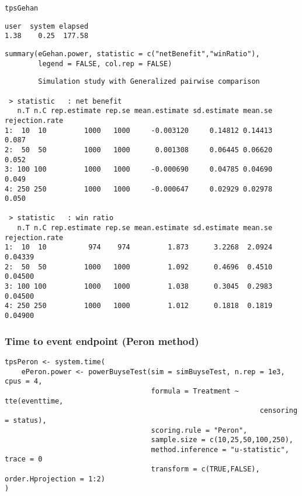 \documentclass[12pt]{article}
\begin{document}
\lstset{language=r,label= ,caption= ,captionpos=b,numbers=none}
\begin{lstlisting}
tpsGehan
\end{lstlisting}

\begin{verbatim}
user  system elapsed 
1.38    0.25  177.58
\end{verbatim}

\lstset{language=r,label= ,caption= ,captionpos=b,numbers=none}
\begin{lstlisting}
summary(eGehan.power, statistic = c("netBenefit","winRatio"), 
		legend = FALSE, col.rep = FALSE)
\end{lstlisting}

\begin{verbatim}
        Simulation study with Generalized pairwise comparison

 > statistic   : net benefit
   n.T n.C rep.estimate rep.se mean.estimate sd.estimate mean.se rejection.rate
1:  10  10         1000   1000     -0.003120     0.14812 0.14413          0.087
2:  50  50         1000   1000      0.001308     0.06445 0.06620          0.052
3: 100 100         1000   1000     -0.000690     0.04785 0.04690          0.049
4: 250 250         1000   1000     -0.000647     0.02929 0.02978          0.050

 > statistic   : win ratio
   n.T n.C rep.estimate rep.se mean.estimate sd.estimate mean.se rejection.rate
1:  10  10          974    974         1.873      3.2268  2.0924        0.04339
2:  50  50         1000   1000         1.092      0.4696  0.4510        0.04500
3: 100 100         1000   1000         1.038      0.3045  0.2983        0.04500
4: 250 250         1000   1000         1.012      0.1818  0.1819        0.04900
\end{verbatim}

\clearpage

\subsubsection{Time to event endpoint (Peron method)}
\label{sec:orgde3aa80}
\lstset{language=r,label= ,caption= ,captionpos=b,numbers=none}
\begin{lstlisting}
tpsPeron <- system.time(
	ePeron.power <- powerBuyseTest(sim = simBuyseTest, n.rep = 1e3, cpus = 4,
								   formula = Treatment ~ tte(eventtime, 
															 censoring = status), 
								   scoring.rule = "Peron",
								   sample.size = c(10,25,50,100,250), 
								   method.inference = "u-statistic", trace = 0
								   transform = c(TRUE,FALSE), order.Hprojection = 1:2)
)
\end{lstlisting}
\end{document}
